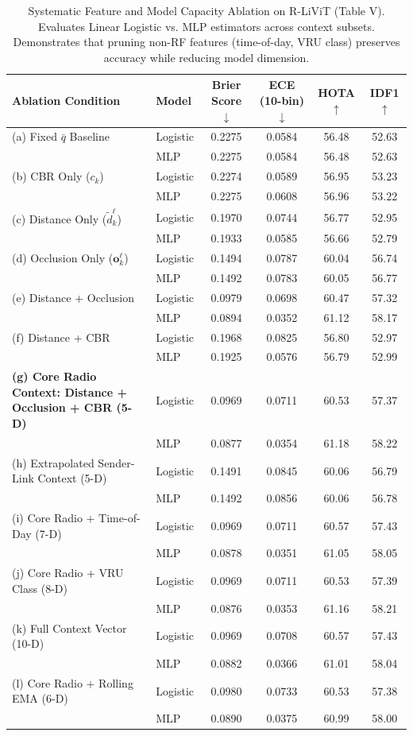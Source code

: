 \begin{table}[!t]
\caption{Systematic Feature and Model Capacity Ablation on R-LiViT (Table V). Evaluates Linear Logistic vs. MLP estimators across context subsets. Demonstrates that pruning non-RF features (time-of-day, VRU class) preserves accuracy while reducing model dimension.}
\label{tab:feature_ablation}
\centering
\small
\begin{tabular}{llcccc}
\toprule
Ablation Condition & Model & Brier Score $\downarrow$ & ECE (10-bin) $\downarrow$ & HOTA $\uparrow$ & IDF1 $\uparrow$ \\
\midrule
(a) Fixed $\bar{q}$ Baseline & Logistic & 0.2275 & 0.0584 & 56.48 & 52.63 \\
 & MLP & 0.2275 & 0.0584 & 56.48 & 52.63 \\
\midrule
(b) CBR Only ($c_k$) & Logistic & 0.2274 & 0.0589 & 56.95 & 53.23 \\
 & MLP & 0.2275 & 0.0608 & 56.96 & 53.22 \\
\midrule
(c) Distance Only ($\tilde{d}_k^\ell$) & Logistic & 0.1970 & 0.0744 & 56.77 & 52.95 \\
 & MLP & 0.1933 & 0.0585 & 56.66 & 52.79 \\
\midrule
(d) Occlusion Only ($\mathbf{o}_k^\ell$) & Logistic & 0.1494 & 0.0787 & 60.04 & 56.74 \\
 & MLP & 0.1492 & 0.0783 & 60.05 & 56.77 \\
\midrule
(e) Distance + Occlusion & Logistic & 0.0979 & 0.0698 & 60.47 & 57.32 \\
 & MLP & 0.0894 & 0.0352 & 61.12 & 58.17 \\
\midrule
(f) Distance + CBR & Logistic & 0.1968 & 0.0825 & 56.80 & 52.97 \\
 & MLP & 0.1925 & 0.0576 & 56.79 & 52.99 \\
\midrule
\textbf{(g) Core Radio Context: Distance + Occlusion + CBR (5-D)} & Logistic & 0.0969 & 0.0711 & 60.53 & 57.37 \\
 & MLP & 0.0877 & 0.0354 & 61.18 & 58.22 \\
\midrule
(h) Extrapolated Sender-Link Context (5-D) & Logistic & 0.1491 & 0.0845 & 60.06 & 56.79 \\
 & MLP & 0.1492 & 0.0856 & 60.06 & 56.78 \\
\midrule
(i) Core Radio + Time-of-Day (7-D) & Logistic & 0.0969 & 0.0711 & 60.57 & 57.43 \\
 & MLP & 0.0878 & 0.0351 & 61.05 & 58.05 \\
\midrule
(j) Core Radio + VRU Class (8-D) & Logistic & 0.0969 & 0.0711 & 60.53 & 57.39 \\
 & MLP & 0.0876 & 0.0353 & 61.16 & 58.21 \\
\midrule
(k) Full Context Vector (10-D) & Logistic & 0.0969 & 0.0708 & 60.57 & 57.43 \\
 & MLP & 0.0882 & 0.0366 & 61.01 & 58.04 \\
\midrule
(l) Core Radio + Rolling EMA (6-D) & Logistic & 0.0980 & 0.0733 & 60.53 & 57.38 \\
 & MLP & 0.0890 & 0.0375 & 60.99 & 58.00 \\
\bottomrule
\end{tabular}
\end{table}